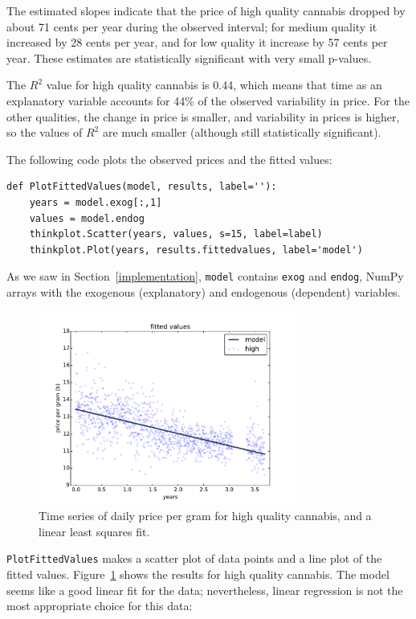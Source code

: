\documentclass[12pt]{book}
\begin{document}
The estimated slopes indicate that the price of high quality cannabis
dropped by about 71 cents per year during the observed interval; for
medium quality it increased by 28 cents per year, and for low quality
it increase by 57 cents per year.  These estimates are
statistically significant with very small p-values.

The $R^2$ value for high quality cannabis is 0.44, which means
that time as an explanatory variable accounts for 44\% of the observed
variability in price.  For the other qualities, the change in price
is smaller, and variability in prices is higher, so the values
of $R^2$ are much smaller (although still statistically significant).

The following code plots the observed prices and the fitted values:

\begin{verbatim}
def PlotFittedValues(model, results, label=''):
    years = model.exog[:,1]
    values = model.endog
    thinkplot.Scatter(years, values, s=15, label=label)
    thinkplot.Plot(years, results.fittedvalues, label='model')
\end{verbatim}

As we saw in Section~\ref{implementation}, {\tt model} contains
{\tt exog} and {\tt endog}, NumPy arrays with the exogenous
(explanatory) and endogenous (dependent) variables.

\begin{figure}
\centerline{\includegraphics[height=2.5in]{figs/timeseries2.pdf}}
\caption{Time series of daily price per gram for high quality cannabis,
and a linear least squares fit.}
\label{timeseries2}
\end{figure}

{\tt PlotFittedValues} makes a scatter plot of data points and a line
plot of the fitted values.  Figure~\ref{timeseries2} shows the results
for high quality cannabis.  The model seems like a good linear fit
for the data; nevertheless, linear regression is not the most 
appropriate choice for this data:
\end{document}

